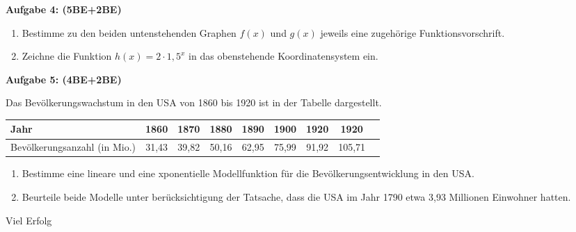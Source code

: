 \documentclass[a4paper,12pt]{article}
\newcommand{\Aufgabe}[1]{
  {
  \vspace*{0.5cm}
  \textsf{\textbf{Aufgabe #1}}
  \vspace*{0.2cm}
  
  }
}
\begin{document}
\Aufgabe{4: (5BE+2BE)}

\begin{enumerate}[label={\alph*)}, topsep=5pt,itemsep=4ex,partopsep=1ex,parsep=1ex]
  \item Bestimme zu den beiden untenstehenden Graphen $f(x)$ und $g(x)$ jeweils eine zugehörige Funktionsvorschrift.\\

  \item Zeichne die Funktion $h(x) = 2 \cdot {1,5}^x$ in das obenstehende Koordinatensystem ein.
\end{enumerate}

\Aufgabe{5: (4BE+2BE)}
Das Bevölkerungswachstum in den USA von 1860 bis 1920 ist in der Tabelle dargestellt.
\begin{table}[h!]
  \centering
  \begin{tabular}{|l|c|c|c|c|c|c|c|c|}
    \hline
    Jahr & 1860 & 1870 & 1880 & 1890 & 1900 & 1920 & 1920 \\
    \hline
    Bevölkerungsanzahl (in Mio.)&31,43&39,82&50,16&62,95&75,99&91,92&105,71 \\
    \hline
  \end{tabular}
\end{table}


\begin{enumerate}[label={\alph*)}, topsep=5pt,itemsep=4ex,partopsep=1ex,parsep=1ex]
  \item Bestimme eine lineare und eine xponentielle Modellfunktion für die Bevölkerungsentwicklung in den USA.
  \item Beurteile beide Modelle unter berücksichtigung der Tatsache, dass die USA im Jahr 1790 etwa 3,93 Millionen Einwohner hatten.
\end{enumerate}

\vspace{10mm}
\begin{center}
Viel Erfolg
\end{center}
\end{document}
